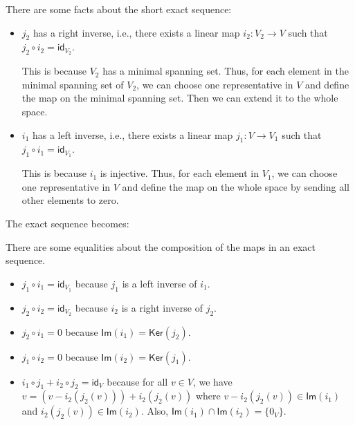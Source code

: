 \documentclass[
	11pt, %
	fleqn, %
	a4paper, %
]{LegrandOrangeBook}
\renewcommand{\ker}[1]{\mathsf{Ker}(#1)} %
\renewcommand{\Im}[1]{\mathsf{Im}(#1)} %
\newcommand{\id}{\mathsf{id}} %
\begin{document}
\begin{example}
\begin{center}
    \end{center}

    There are some facts about the short exact sequence:
    \begin{itemize}
        \item $j_2$ has a right inverse, i.e., there exists a linear map $i_2 : V_2 \to V$ such that $j_2 \circ i_2 = \id_{V_2}$.
        
        This is because $V_2$ has a minimal spanning set. Thus, for each element in the minimal spanning set of $V_2$, we can choose one representative in $V$ and define the map on the minimal spanning set. Then we can extend it to the whole space.
        \item $i_1$ has a left inverse, i.e., there exists a linear map $j_1 : V \to V_1$ such that $j_1 \circ i_1 = \id_{V_1}$. 
        
        This is because $i_1$ is injective. Thus, for each element in $V_1$, we can choose one representative in $V$ and define the map on the whole space by sending all other elements to zero.
    \end{itemize}

    The exact sequence becomes:
    \begin{center}
    \end{center}

\end{example}

There are some equalities about the composition of the maps in an exact sequence.
\begin{itemize}
    \item $j_1 \circ i_1 = \id_{V_1}$ because $j_1$ is a left inverse of $i_1$.
    \item $j_2 \circ i_2 = \id_{V_2}$ because $i_2$ is a right inverse of $j_2$.
    \item $j_2 \circ i_1 = 0$ because $\Im{i_1} = \ker{j_2}$.
    \item $j_1 \circ i_2 = 0$ because $\Im{i_2} = \ker{j_1}$.
    \item $i_1 \circ j_1 + i_2 \circ j_2 = \id_V$ because for all $v \in V$, we have $v = (v - i_2(j_2(v))) + i_2(j_2(v))$ where $v - i_2(j_2(v)) \in \Im{i_1}$ and $i_2(j_2(v)) \in \Im{i_2}$. Also, $\Im{i_1} \cap \Im{i_2} = \{0_V\}$.
\end{itemize}
\end{document}
